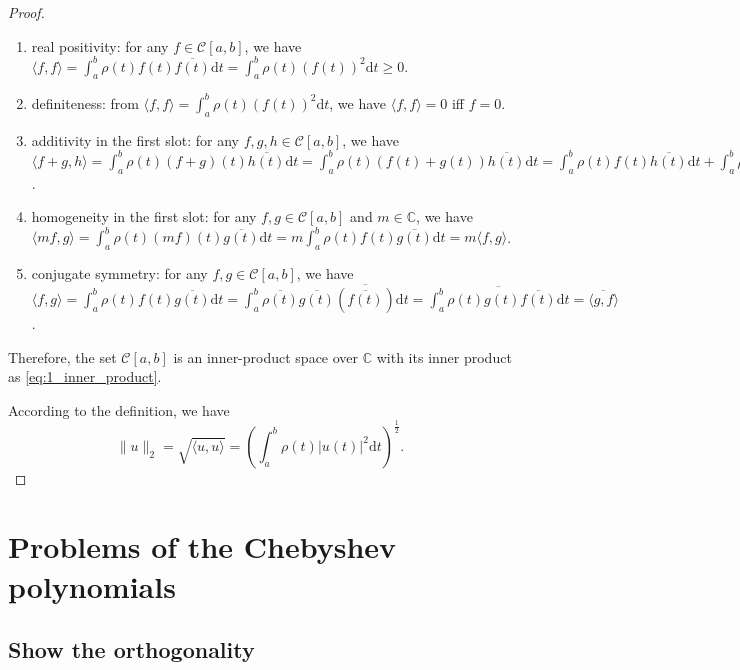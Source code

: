 \documentclass[a4paper]{article}
\begin{document}
\begin{proof}
\begin{enumerate}
    \item real positivity: for any $f \in \mathcal{C}[a, b]$, we have $\langle f, f\rangle = \int_a^b \rho(t) f(t) \overline{f(t)} \mathrm{d}t = \int_a^b \rho(t) (f(t))^2 \mathrm{d}t \geqslant 0$.
    \item definiteness: from $\langle f, f \rangle = \int_a^b \rho(t) (f(t))^2 \mathrm{d}t$, we have $\langle f, f \rangle = 0$ iff $f = 0$.
    \item additivity in the first slot: for any $f, g, h \in \mathcal{C}[a, b]$, we have $\langle f + g, h \rangle = \int_a^b \rho(t) (f + g)(t) \overline{h(t)} \mathrm{d}t = \int_a^b \rho(t) (f(t) + g(t)) \overline{h(t)} \mathrm{d}t = \int_a^b \rho(t) f(t) \overline{h(t)} \mathrm{d}t + \int_a^b \rho(t) g(t) \overline{h(t)} \mathrm{d}t = \langle f, h \rangle + \langle g, h \rangle$.
    \item homogeneity in the first slot: for any $f, g \in \mathcal{C}[a, b]$ and $m \in \mathbb{C}$, we have $\langle mf, g \rangle = \int_a^b \rho(t) (mf)(t) \overline{g(t)} \mathrm{d}t = m\int_a^b \rho(t) f(t) \overline{g(t)} \mathrm{d}t = m\langle f, g \rangle$.
    \item conjugate symmetry: for any $f, g \in \mathcal{C}[a, b]$, we have $\langle f, g \rangle = \int_a^b \rho(t) f(t) \overline{g(t)} \mathrm{d}t = \int_a^b \overline{\rho(t)} \overline{g(t)} \overline{(\overline{f(t)})} \mathrm{d}t = \overline{\int_a^b \rho(t) g(t) \overline{f(t)} \mathrm{d}t} = \overline{\langle g, f \rangle}$.
\end{enumerate}
Therefore, the set $\mathcal{C}[a, b]$ is an inner-product space over $\mathbb{C}$ with its inner product as \cref{eq:1_inner_product}.

According to the definition, we have
\begin{equation}
    \|u\|_2 =  \sqrt{\langle u, u \rangle} = \left(\int_a^b \rho(t) |u(t)|^2 \mathrm{d}t\right)^{\frac{1}{2}}.
    \label{eq:1_2_norm_2}
\end{equation}

\end{proof}

\section{Problems of the Chebyshev polynomials}

\subsection{Show the orthogonality}
\end{document}
